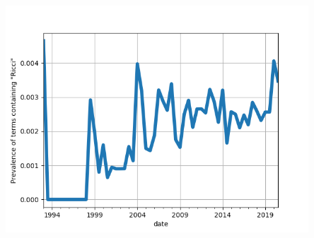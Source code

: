 \documentclass[10pt]{beamer}
\begin{document}
\begin{frame}
\begin{columns}
\begin{column}{0.6\textwidth}
\begin{center}
                \includegraphics[width=0.85\textwidth]{../Images/ricci_preval.png}
            \end{center}
        \end{column}
    \end{columns}
\end{frame}
\end{document}
